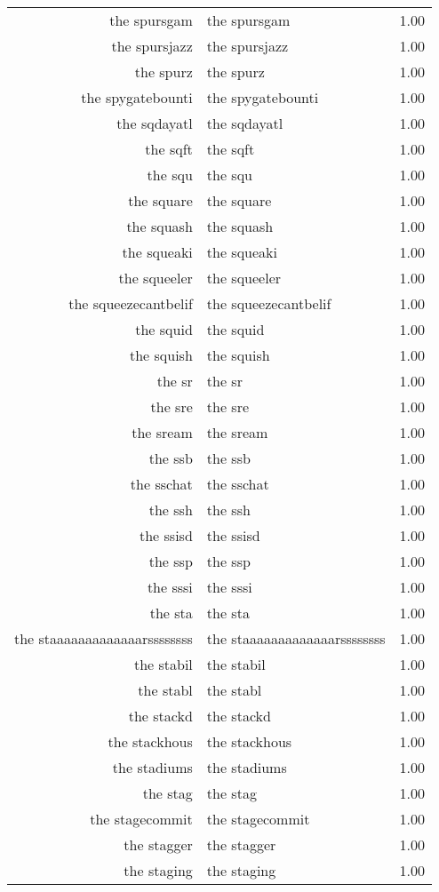\begin{table}[ht]
\begin{tabular}{rlr}
  the spursgam & the spursgam & 1.00 \\ 
  the spursjazz & the spursjazz & 1.00 \\ 
  the spurz & the spurz & 1.00 \\ 
  the spygatebounti & the spygatebounti & 1.00 \\ 
  the sqdayatl & the sqdayatl & 1.00 \\ 
  the sqft & the sqft & 1.00 \\ 
  the squ & the squ & 1.00 \\ 
  the square & the square & 1.00 \\ 
  the squash & the squash & 1.00 \\ 
  the squeaki & the squeaki & 1.00 \\ 
  the squeeler & the squeeler & 1.00 \\ 
  the squeezecantbelif & the squeezecantbelif & 1.00 \\ 
  the squid & the squid & 1.00 \\ 
  the squish & the squish & 1.00 \\ 
  the sr & the sr & 1.00 \\ 
  the sre & the sre & 1.00 \\ 
  the sream & the sream & 1.00 \\ 
  the ssb & the ssb & 1.00 \\ 
  the sschat & the sschat & 1.00 \\ 
  the ssh & the ssh & 1.00 \\ 
  the ssisd & the ssisd & 1.00 \\ 
  the ssp & the ssp & 1.00 \\ 
  the sssi & the sssi & 1.00 \\ 
  the sta & the sta & 1.00 \\ 
  the staaaaaaaaaaaaarssssssss & the staaaaaaaaaaaaarssssssss & 1.00 \\ 
  the stabil & the stabil & 1.00 \\ 
  the stabl & the stabl & 1.00 \\ 
  the stackd & the stackd & 1.00 \\ 
  the stackhous & the stackhous & 1.00 \\ 
  the stadiums & the stadiums & 1.00 \\ 
  the stag & the stag & 1.00 \\ 
  the stagecommit & the stagecommit & 1.00 \\ 
  the stagger & the stagger & 1.00 \\ 
  the staging & the staging & 1.00 \\ 

\end{tabular}
\end{table}
